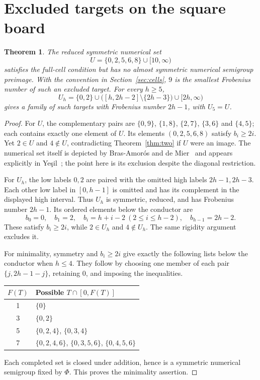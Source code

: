 \documentclass[11pt,a4paper]{article}
\newtheorem{theorem}{Theorem}
\theoremstyle{definition}
\theoremstyle{remark}
\begin{document}
\section{Excluded targets on the square board}
\begin{theorem}\label{thm:diagonal}
The reduced symmetric numerical set
\[
 U=\{0,2,5,6,8\}\cup[10,\infty)
\]
satisfies the full-cell condition but has no almost symmetric numerical
semigroup preimage. With the convention in Section~\ref{sec:cells}, $9$ is the smallest
Frobenius number of such an excluded target. For every $h\geq5$,
\[
 U_h=\{0,2\}\cup\bigl([h,2h-2]\setminus\{2h-3\}\bigr)\cup[2h,\infty)
\]
gives a family of such targets with Frobenius number $2h-1$, with $U_5=U$.
\end{theorem}
\begin{proof}
For $U$, the complementary pairs are $\{0,9\}$, $\{1,8\}$,
$\{2,7\}$, $\{3,6\}$ and $\{4,5\}$; each contains exactly one element
of $U$. Its elements $(0,2,5,6,8)$ satisfy $b_i\geq2i$.
Yet $2\in U$ and $4\notin U$, contradicting Theorem~\ref{thm:two}
if $U$ were an image. The numerical set itself is depicted by
Bras-Amor\'os and de Mier~\cite[Remark~2.5]{BM} and appears explicitly
in Ye\c{s}il~\cite[Example~5.3]{Y}; the point here is its exclusion
despite the diagonal restriction.

For $U_h$, the low labels $0,2$ are paired with the omitted high labels
$2h-1,2h-3$. Each other low label in $[0,h-1]$ is omitted and has its
complement in the displayed high interval. Thus $U_h$ is symmetric,
reduced, and has Frobenius number $2h-1$. Its ordered elements below the
conductor are
\[
 b_0=0,\quad b_1=2,\quad
 b_i=h+i-2\ (2\leq i\leq h-2),\quad b_{h-1}=2h-2.
\]
These satisfy $b_i\geq2i$, while $2\in U_h$ and $4\notin U_h$.
The same rigidity argument excludes it.

For minimality, symmetry and $b_i\geq2i$ give exactly the following lists
below the conductor when $h\leq4$. They follow by choosing one member
of each pair $\{j,2h-1-j\}$, retaining $0$, and imposing the inequalities.
\begin{center}
\begin{tabular}{cl}
\toprule
$F(T)$ & Possible $T\cap[0,F(T)]$\\
\midrule
1 & $\{0\}$\\
3 & $\{0,2\}$\\
5 & $\{0,2,4\}$, $\{0,3,4\}$\\
7 & $\{0,2,4,6\}$, $\{0,3,5,6\}$, $\{0,4,5,6\}$\\
\bottomrule
\end{tabular}
\end{center}
Each completed set is closed under addition, hence is a symmetric
numerical semigroup fixed by $\Phi$. This proves the minimality assertion.
\end{proof}
\end{document}
